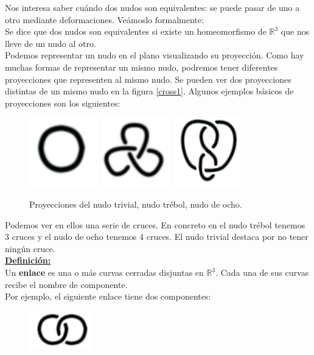Nos interesa saber cuándo dos nudos son equivalentes: se puede pasar de uno a otro mediante deformaciones. Veámoslo formalmente:\\

Se dice que dos nudos son equivalentes si existe un homeomorfismo de  $\mathds{R}^{3}$ que nos lleve de un nudo al otro. \\


Podemos representar un nudo en el plano visualizando su proyección. Como hay muchas formas de representar un mismo nudo, podremos tener diferentes proyecciones que representen al mismo nudo. Se pueden ver dos proyecciones distintas de un mismo nudo en la figura \ref{cross1}. Algunos ejemplos básicos de proyecciones son los siguientes:\\
  \begin{figure}[h!]
  	\includegraphics[width=3cm]{inudos/1.jpg}
  	\includegraphics[width=3cm]{inudos/3f.png} 
  	\includegraphics[width=3cm]{inudos/fig8.jpg}
  	\centering
  	\caption{Proyecciones del nudo trivial, nudo trébol, nudo de ocho.}
  	\label{uno} 
  \end{figure}
  
  Podemos ver en ellos una serie de cruces. En concreto en el nudo trébol tenemos 3 cruces y el nudo de ocho tenemos 4 cruces. El nudo trivial destaca por no tener ningún cruce. \\
  
    \underline{\textbf{Definición:}}\\
     Un \textbf{enlace} es una o más curvas cerradas disjuntas en $\mathds{R}^{3}$. Cada una de sus curvas recibe el nombre de componente.\\
     Por ejemplo, el siguiente enlace tiene dos componentes:
  \begin{figure}[h!]
  	\includegraphics[width=2.7cm]{inudos/enlace.png}
  	\centering
  	\label{dos} 
  \end{figure}

